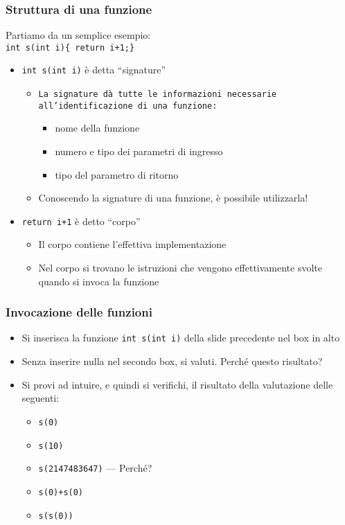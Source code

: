 \documentclass{beamer}
\begin{document}
\begin{frame}
\frametitle{Struttura di una funzione}
Partiamo da un semplice esempio:\\ \texttt{int s(int i)\{ return i+1;\}}
\begin{itemize}
 \item \texttt{int s(int i)} è detta ``signature''
  \begin{itemize}
    \item \texttt{La signature dà tutte le informazioni necessarie all'identificazione di una funzione:}
  \begin{itemize}
    \item nome della funzione
    \item numero e tipo dei parametri di ingresso
    \item tipo del parametro di ritorno
  \end{itemize}
  \item Conoscendo la signature di una funzione, è possibile utilizzarla!
  \end{itemize}
 \item \texttt{return i+1} è detto ``corpo''
  \begin{itemize}
    \item Il corpo contiene l'effettiva implementazione
    \item Nel corpo si trovano le istruzioni che vengono effettivamente svolte quando si invoca la funzione
  \end{itemize}
\end{itemize}
\end{frame}

\begin{frame}
\frametitle{Invocazione delle funzioni}
\begin{itemize}
 \item Si inserisca la funzione \texttt{int s(int i)} della slide precedente nel box in alto
 \item Senza inserire nulla nel secondo box, si valuti. Perché questo risultato?
 \item Si provi ad intuire, e quindi si verifichi, il risultato della valutazione delle seguenti:
\begin{itemize}
 \item \texttt{s(0)}
 \item \texttt{s(10)}
 \item \texttt{s(2147483647)} --- Perché?
 \item \texttt{s(0)+s(0)}
 \item \texttt{s(s(0))}
\end{itemize}
\end{itemize}
\end{frame}
\end{document}
